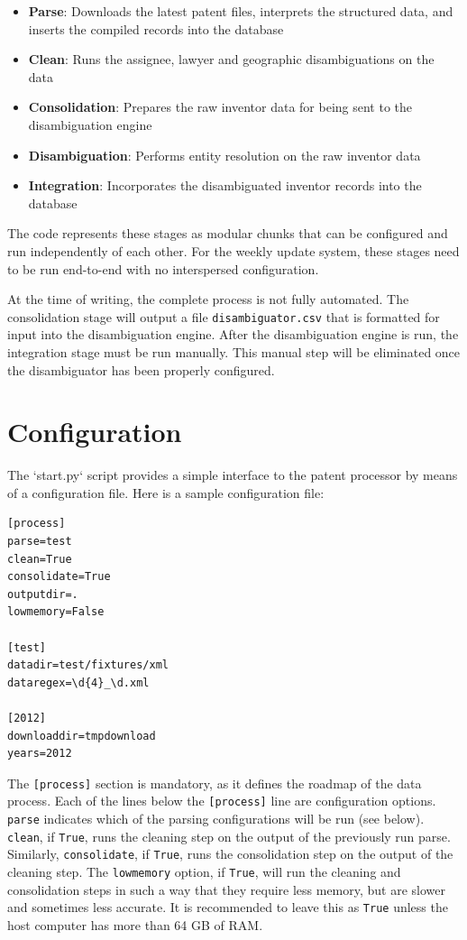 \documentclass[11pt]{article}
\begin{document}
\begin{itemize}
    \item \textbf{Parse}: Downloads the latest patent files, interprets the structured data, and inserts the compiled records into the database
    \item \textbf{Clean}: Runs the assignee, lawyer and geographic disambiguations on the data
    \item \textbf{Consolidation}: Prepares the raw inventor data for being sent to the disambiguation engine
    \item \textbf{Disambiguation}: Performs entity resolution on the raw inventor data
    \item \textbf{Integration}: Incorporates the disambiguated inventor records into the database
\end{itemize}

The code represents these stages as modular chunks that can be configured and
run independently of each other. For the weekly update system, these stages
need to be run end-to-end with no interspersed configuration.

At the time of writing, the complete process is not fully automated. The
consolidation stage will output a file \verb`disambiguator.csv` that is
formatted for input into the disambiguation engine. After the disambiguation
engine is run, the integration stage must be run manually. This manual step
will be eliminated once the disambiguator has been properly configured.


\section{Configuration}

The `start.py` script provides a simple interface to the patent processor by means of a
configuration file. Here is a sample configuration file:

\begin{verbatim}
[process]
parse=test
clean=True
consolidate=True
outputdir=.
lowmemory=False

[test]
datadir=test/fixtures/xml
dataregex=\d{4}_\d.xml

[2012]
downloaddir=tmpdownload
years=2012
\end{verbatim}

The \verb`[process]` section is mandatory, as it defines the roadmap of the
data process. Each of the lines below the \verb`[process]` line are
configuration options. \verb`parse` indicates which of the parsing
configurations will be run (see below). \verb`clean`, if \verb`True`, runs the
cleaning step on the output of the previously run parse. Similarly,
\verb`consolidate`, if \verb`True`, runs the consolidation step on the output
of the cleaning step. The \verb`lowmemory` option, if \verb`True`, will run the
cleaning and consolidation steps in such a way that they require less memory,
but are slower and sometimes less accurate. It is recommended to leave this as
\verb`True` unless the host computer has more than 64 GB of RAM.
\end{document}
